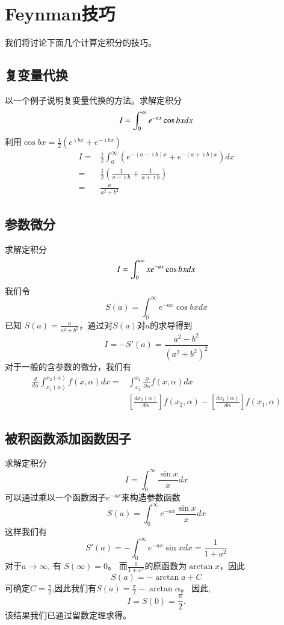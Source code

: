 \section{Feynman技巧}
我们将讨论下面几个计算定积分的技巧。

\subsection{复变量代换}
以一个例子说明复变量代换的方法。求解定积分
\[
    I =  \int_0^{\infty} e^{-a x} \cos b x d x \\
\]
利用$\cos{bx} = \frac{1}{2}\left( e^{\imath b x} + e^{-\imath bx}\right)$
\[    \begin{aligned}
    I= & \frac{1}{2} \int_{0}^{\infty} \left(e^{-(a-\imath b) x} + e^{-(a + \imath b) x} \right)  d x \\
    = & \frac{1}{2} \left( \frac{1}{a-\imath b} +  \frac{1}{a+\imath b} \right)\\
    = & \frac{a}{a^2+b^2}
\end{aligned}
\]

\subsection{参数微分}
求解定积分
\[
    I =  \int_0^{\infty} x e^{-a x} \cos b x d x \\
\]
我们令
\[
  S(a) =   \int_0^{\infty} e^{-a x} \cos b x d x 
\]
已知 $S(a) = \frac{a}{a^2+b^2}$，通过对$S(a)$对$a$的求导得到
\[
    I = - S'(a)  = \frac{a^2 - b^2}{(a^2 +b^2)^2}    
\]
对于一般的含参数的微分，我们有
\begin{equation}
    \begin{aligned}
    \frac{d}{d \alpha} \int_{x_1(\alpha)}^{x_2(\alpha)} f(x, \alpha) d x= & \int_{x_1}^{x_2} \frac{\partial}{\partial \alpha} f(x, \alpha) d x \\
    & \left[\frac{d x_2(\alpha)}{d \alpha} \right] f(x_2, \alpha)- 
    \left[\frac{d x_1(\alpha)}{d \alpha}\right] f(x_1, \alpha)
    \end{aligned}
\end{equation}

\subsection{被积函数添加函数因子}
求解定积分
\[
    I =  \int_0^{\infty} \frac{\sin{x}}{x} d x 
\]
可以通过乘以一个函数因子$e^{-a x}$来构造参数函数
\[
 S(a) =     \int_0^{\infty}  e^{-a x} \frac{\sin{x}}{x} d x 
\]
这样我们有
\[
  S'(a) = -  \int_0^{\infty}  e^{-a x} \sin{x} d x  = \frac{1}{1+a^2}
\]
对于$a \to \infty$, 有 $S(\infty) = 0$。
而$\frac{1}{1+x^2}$的原函数为$\arctan{x}$，因此
\[S(a) = - \arctan{a} + C\]
可确定$C = \frac{\pi}{2}$,因此我们有$S(a) = \frac{\pi}{2} - \arctan{\alpha}$。
因此,
\[
  I = S(0) = \frac{\pi}{2} .    
\]
该结果我们已通过留数定理求得。